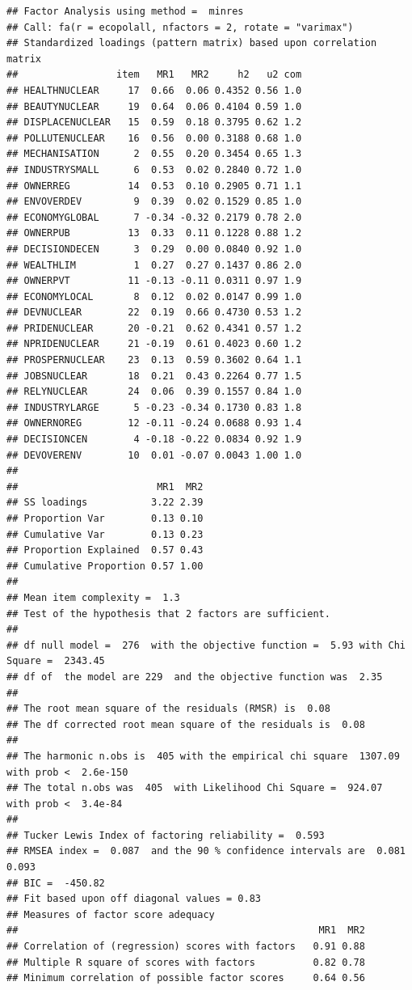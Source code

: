 \documentclass[
]{article}
\begin{document}
\begin{verbatim}
## Factor Analysis using method =  minres
## Call: fa(r = ecopolall, nfactors = 2, rotate = "varimax")
## Standardized loadings (pattern matrix) based upon correlation matrix
##                 item   MR1   MR2     h2   u2 com
## HEALTHNUCLEAR     17  0.66  0.06 0.4352 0.56 1.0
## BEAUTYNUCLEAR     19  0.64  0.06 0.4104 0.59 1.0
## DISPLACENUCLEAR   15  0.59  0.18 0.3795 0.62 1.2
## POLLUTENUCLEAR    16  0.56  0.00 0.3188 0.68 1.0
## MECHANISATION      2  0.55  0.20 0.3454 0.65 1.3
## INDUSTRYSMALL      6  0.53  0.02 0.2840 0.72 1.0
## OWNERREG          14  0.53  0.10 0.2905 0.71 1.1
## ENVOVERDEV         9  0.39  0.02 0.1529 0.85 1.0
## ECONOMYGLOBAL      7 -0.34 -0.32 0.2179 0.78 2.0
## OWNERPUB          13  0.33  0.11 0.1228 0.88 1.2
## DECISIONDECEN      3  0.29  0.00 0.0840 0.92 1.0
## WEALTHLIM          1  0.27  0.27 0.1437 0.86 2.0
## OWNERPVT          11 -0.13 -0.11 0.0311 0.97 1.9
## ECONOMYLOCAL       8  0.12  0.02 0.0147 0.99 1.0
## DEVNUCLEAR        22  0.19  0.66 0.4730 0.53 1.2
## PRIDENUCLEAR      20 -0.21  0.62 0.4341 0.57 1.2
## NPRIDENUCLEAR     21 -0.19  0.61 0.4023 0.60 1.2
## PROSPERNUCLEAR    23  0.13  0.59 0.3602 0.64 1.1
## JOBSNUCLEAR       18  0.21  0.43 0.2264 0.77 1.5
## RELYNUCLEAR       24  0.06  0.39 0.1557 0.84 1.0
## INDUSTRYLARGE      5 -0.23 -0.34 0.1730 0.83 1.8
## OWNERNOREG        12 -0.11 -0.24 0.0688 0.93 1.4
## DECISIONCEN        4 -0.18 -0.22 0.0834 0.92 1.9
## DEVOVERENV        10  0.01 -0.07 0.0043 1.00 1.0
## 
##                        MR1  MR2
## SS loadings           3.22 2.39
## Proportion Var        0.13 0.10
## Cumulative Var        0.13 0.23
## Proportion Explained  0.57 0.43
## Cumulative Proportion 0.57 1.00
## 
## Mean item complexity =  1.3
## Test of the hypothesis that 2 factors are sufficient.
## 
## df null model =  276  with the objective function =  5.93 with Chi Square =  2343.45
## df of  the model are 229  and the objective function was  2.35 
## 
## The root mean square of the residuals (RMSR) is  0.08 
## The df corrected root mean square of the residuals is  0.08 
## 
## The harmonic n.obs is  405 with the empirical chi square  1307.09  with prob <  2.6e-150 
## The total n.obs was  405  with Likelihood Chi Square =  924.07  with prob <  3.4e-84 
## 
## Tucker Lewis Index of factoring reliability =  0.593
## RMSEA index =  0.087  and the 90 % confidence intervals are  0.081 0.093
## BIC =  -450.82
## Fit based upon off diagonal values = 0.83
## Measures of factor score adequacy             
##                                                    MR1  MR2
## Correlation of (regression) scores with factors   0.91 0.88
## Multiple R square of scores with factors          0.82 0.78
## Minimum correlation of possible factor scores     0.64 0.56
\end{verbatim}
\end{document}
